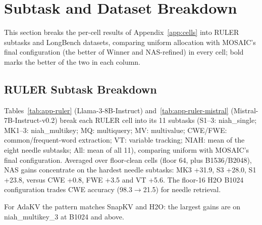 \FloatBarrier
\section{Subtask and Dataset Breakdown}
\label{app:breakdown}

This section breaks the per-cell results of Appendix~\ref{app:cells} into RULER subtasks and LongBench datasets, comparing uniform allocation with MOSAIC's final configuration (the better of Winner and NAS-refined) in every cell; bold marks the better of the two in each column.


\subsection{RULER Subtask Breakdown}
\label{app:ruler}

Tables~\ref{tab:app-ruler} (Llama-3-8B-Instruct) and~\ref{tab:app-ruler-mistral} (Mistral-7B-Instruct-v0.2) break each RULER cell into its 11 subtasks (S1--3: niah\_single; MK1--3: niah\_multikey; MQ: multiquery; MV: multivalue; CWE/FWE: common/frequent-word extraction; VT: variable tracking; NIAH: mean of the eight needle subtasks; All: mean of all 11), comparing uniform with MOSAIC's final configuration. Averaged over floor-clean cells (floor 64, plus B1536/B2048), NAS gains concentrate on the hardest needle subtasks: MK3 +31.9, S3 +28.0, S1 +23.8, versus CWE +0.8, FWE +3.5 and VT +5.6. The floor-16 H2O B1024 configuration trades CWE accuracy (98.3$\rightarrow$21.5) for needle retrieval.


For AdaKV the pattern matches SnapKV and H2O: the largest gains are on niah\_multikey\_3 at B1024 and above.

